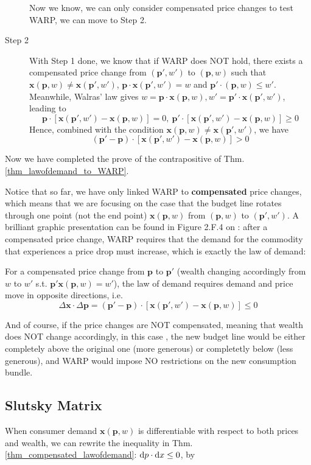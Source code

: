 \begin{description}
    Now we know, we can only consider compensated price changes to test WARP, we can move to Step 2.
    \item[Step 2] With Step 1 done, we know that if WARP does NOT hold, there exists a compensated price change from $(\mathbf{p}',w')$ to $(\mathbf{p},w)$ such that $\mathbf{x}(\mathbf{p},w)\neq \mathbf{x}(\mathbf{p}',w')$, $\mathbf{p}\cdot \mathbf{x}(\mathbf{p}',w')=w$ and $\mathbf{p'}\cdot (\mathbf{p},w)\leq w'$. 
    Meanwhile, Walras' law gives $w= \mathbf{p}\cdot\mathbf{x}(\mathbf{p},w),w'=\mathbf{p}'\cdot\mathbf{x}(\mathbf{p}',w')$, leading to 
    $$\mathbf{p}\cdot\left[\mathbf{x}(\mathbf{p}',w')-\mathbf{x}(\mathbf{p},w)\right]=0,\ \mathbf{p}'\cdot\left[\mathbf{x}(\mathbf{p}',w')-\mathbf{x}(\mathbf{p},w)\right]\geq 0$$
    Hence, combined with the condition $\mathbf{x}(\mathbf{p},w)\neq \mathbf{x}(\mathbf{p}',w')$, we have
    $$(\mathbf{p}'-\mathbf{p})\cdot\left[\mathbf{x}(\mathbf{p}',w')-\mathbf{x}(\mathbf{p},w)\right]> 0$$ 
\end{description}
Now we have completed the prove of the contrapositive of Thm.\ref{thm_lawofdemand_to_WARP}.

Notice that so far, we have only linked WARP to \textbf{compensated} price changes, which means that we are focusing on the case that the budget line rotates through one point (not the end point) $\mathbf{x}(\mathbf{p},w)$ from $(\mathbf{p},w)$ to $(\mathbf{p}',w')$. A brilliant graphic presentation can be found in Figure 2.F.4 on \citet[Page 33]{mas1995microeconomic}: after a compensated price change, WARP requires that the demand for the commodity that experiences a price drop must increase, which is exactly the law of demand:
\begin{theorem}\label{thm_compensated_lawofdemand}
    For a compensated price change from $\mathbf{p}$ to $\mathbf{p}'$ (wealth changing accordingly from $w$ to $w'$ s.t. $\mathbf{p}'\mathbf{x}(\mathbf{p},w)=w'$), the law of demand requires demand and price move in opposite directions, i.e.
    $$\Delta \mathbf{x}\cdot \Delta \mathbf{p} = (\mathbf{p}'-\mathbf{p})\cdot [\mathbf{x}(\mathbf{p}',w')-\mathbf{x}(\mathbf{p},w)]\leq 0$$
\end{theorem}

And of course, if the price changes are NOT compensated, meaning that wealth does NOT change accordingly, in this case \citep[Figure 2.F.5, Page 33]{mas1995microeconomic}, the new budget line would be either completely above the original one (more generous) or completetly below (less generous), and WARP would impose NO restrictions on the new consumption bundle.

\subsection{Slutsky Matrix}
When consumer demand $\mathbf{x}(\mathbf{p},w)$ is differentiable with respect to both prices and wealth, we can rewrite the inequality in Thm.\ref{thm_compensated_lawofdemand}: $\mathop{}\!\mathrm{d} p\cdot \mathop{}\!\mathrm{d} x\leq 0$, by